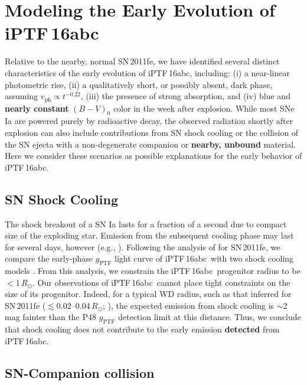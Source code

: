 \documentclass[twocolumn]{aastex61}
\newcommand{\sr}{R_\odot}
\newcommand{\abc}{iPTF\,16abc}
\begin{document}
\section{\textbf{Modeling the Early Evolution of \abc}} \label{sec:lc_energy}

Relative to the nearby, normal SN\,2011fe, we have identified several distinct
characteristics of the early evolution of \abc, including: (i) a near-linear
photometric rise, (ii) a qualitatively short, or possibly absent, dark phase,
assuming $v_\mathrm{ph} \propto t^{-0.22}$, (iii) the presence of strong
 absorption, and (iv) blue and \textbf{nearly constant} $(B - V)_0$
color in the week after explosion. While most SNe Ia are powered purely by
radioactive decay, the observed radiation shortly after explosion can also
include contributions from SN shock cooling or the collision of the SN ejecta
with a non-degenerate companion or \textbf{nearby, unbound} material. Here we
consider these scenarios as possible explanations for the early behavior of
\abc.

\subsection{SN Shock Cooling}

The shock breakout of a SN Ia lasts for a fraction of a second due to compact
size of the exploding star. Emission from the subsequent cooling phase may
last for several days, however (e.g., \citealt{2010ApJ...708..598P}).
Following the analysis of \citet{2012ApJ...744L..17B} for SN\,2011fe, we
compare the early-phase $g_\mathrm{PTF}$ light curve of \abc\ with two shock
cooling models \citep{2011ApJ...728...63R, 2010ApJ...708..598P}. From this
analysis, we constrain the \abc\ progenitor radius to be $<1\,\sr$. Our
observations of \abc\ cannot place tight constraints on the size of its
progenitor. Indeed, for a typical WD radius, such as that inferred for
SN\,2011fe ($\lesssim 0.02$--$0.04\,\sr$; \citealt{2012ApJ...744L..17B,
2014ApJ...784...85P}), the expected emission from shock cooling is
$\sim$2\,mag fainter than the P48 $g_\mathrm{PTF}$ detection limit at this
distance. Thus, we conclude that shock cooling does not contribute to the
early emission \textbf{detected} from \abc.

\subsection{SN-Companion collision}
\label{sec:companion}
\end{document}
